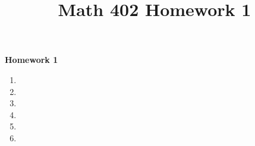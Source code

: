\documentclass[oneside]{memoir}
\title{Math 402 Homework 1}
\begin{document}
\begin{center}
	\textbf{\large Homework 1} \\
\end{center}

\begin{enumerate}
	\item 
	\item 
	\item 
	\item 
	\item 
	\item 
\end{enumerate}
\end{document}

